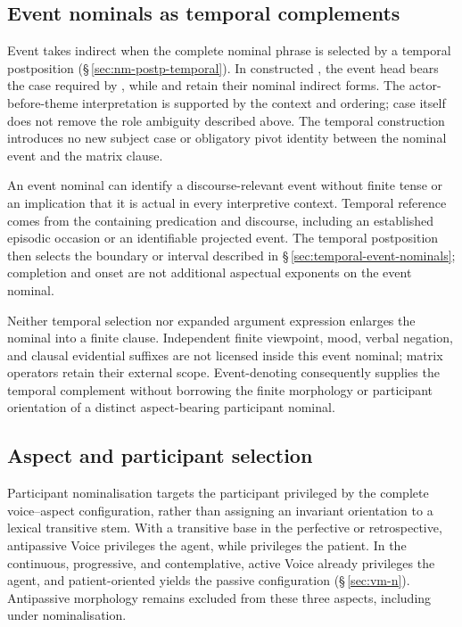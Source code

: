 \subsection{Event nominals as temporal complements}
\label{sec:nm-derived-temporal}

Event  takes indirect  when the complete
nominal phrase is selected by a temporal postposition
(§\,\ref{sec:nm-postp-temporal}). In constructed
 , the event head bears the case required by , while
 and  retain their nominal indirect forms. The
actor-before-theme interpretation is supported by the context and ordering;
case itself does not remove the role ambiguity described above. The temporal
construction introduces no new subject case or obligatory pivot identity
between the nominal event and the matrix clause.

An event nominal can identify a discourse-relevant event without
finite tense or an implication that it is actual in every interpretive context.
Temporal reference comes from the containing predication and discourse,
including an established episodic occasion or an identifiable projected event.
The temporal postposition then selects the boundary or interval described in
§\,\ref{sec:temporal-event-nominals}; completion and onset are not additional
aspectual exponents on the event nominal.

Neither temporal selection nor expanded argument expression enlarges the
nominal into a finite clause. Independent finite viewpoint, mood, verbal
negation, and clausal evidential suffixes are not licensed inside this event
nominal; matrix operators retain their external scope. Event-denoting
 consequently supplies the temporal complement without
borrowing the finite morphology or participant orientation of a distinct
aspect-bearing participant nominal.

\subsection{Aspect and participant selection}\label{sec:nm-derived-participant}
Participant nominalisation targets the participant privileged by the complete
voice--aspect configuration, rather than assigning an invariant orientation to
a lexical transitive stem. With a transitive base in the perfective or
retrospective, antipassive Voice privileges the agent, while 
privileges the patient. In the continuous, progressive, and contemplative,
active Voice already privileges the agent, and patient-oriented 
yields the passive configuration (§\,\ref{sec:vm-n}). Antipassive morphology
remains excluded from these three aspects, including under nominalisation.

